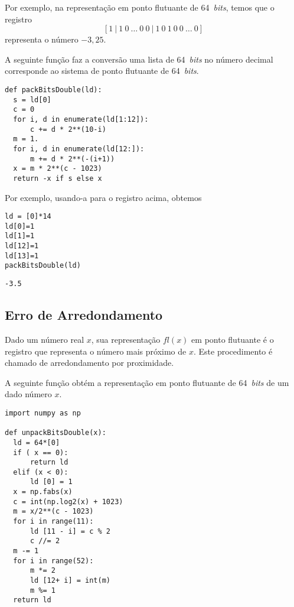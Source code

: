 \begin{ex}
  Por exemplo, na representação em ponto flutuante de 64~{\it bits}, temos que o registro
  \begin{equation}\label{eq:regfloat64}
    [1 ~ | ~ 1 ~ 0 ~ \ldots ~ 0 ~ 0 ~ | ~ 1 ~ 0 ~ 1 ~ 0 ~ 0 ~ \ldots ~ 0]
  \end{equation}
  representa o número $-3,25$.

  A seguinte função faz a conversão  uma lista de 64~{\it bits} no número decimal corresponde ao sistema de ponto flutuante de 64~{\it bits}.

\begin{lstlisting}[caption=packBitsDouble.py, label=cod:packBitsDouble]
def packBitsDouble(ld):
  s = ld[0]
  c = 0
  for i, d in enumerate(ld[1:12]):
      c += d * 2**(10-i)
  m = 1.
  for i, d in enumerate(ld[12:]):
      m += d * 2**(-(i+1))
  x = m * 2**(c - 1023)
  return -x if s else x
\end{lstlisting}

Por exemplo, usando-a para o registro acima, obtemos

\begin{lstlisting}
ld = [0]*14
ld[0]=1 
ld[1]=1 
ld[12]=1
ld[13]=1
packBitsDouble(ld)
\end{lstlisting}

\begin{verbatim}
-3.5
\end{verbatim}
\end{ex}

\subsection{Erro de Arredondamento}

Dado um número real $x$, sua representação $fl(x)$ em ponto flutuante é o registro que representa o número mais próximo de $x$. Este procedimento é chamado de arredondamento por proximidade.

A seguinte função obtém a representação em ponto flutuante de 64~{\it bits} de um dado número $x$.

\begin{lstlisting}[caption=unpackBitsDouble.py, label=cod:unpackBitsDouble]
import numpy as np

def unpackBitsDouble(x):
  ld = 64*[0]
  if ( x == 0):
      return ld
  elif (x < 0):
      ld [0] = 1
  x = np.fabs(x)
  c = int(np.log2(x) + 1023)
  m = x/2**(c - 1023)
  for i in range(11):
      ld [11 - i] = c % 2
      c //= 2
  m -= 1
  for i in range(52):
      m *= 2
      ld [12+ i] = int(m)
      m %= 1
  return ld
\end{lstlisting}

